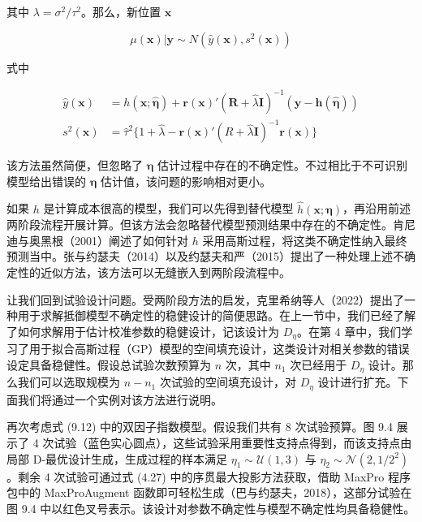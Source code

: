 \documentclass{ctexart}
\begin{document}
其中 $\lambda=\sigma^2/\tau^2$。那么，新位置 $\boldsymbol{x}$ 

\begin{equation*}
\mu(\boldsymbol{x})|\boldsymbol{y}\sim\mathcal{}{N}(\widehat{y}(\boldsymbol{x}),s^2(\boldsymbol{x}))
\end{equation*}

式中

\begin{align*}
\widehat{y}(\boldsymbol{x})&=h(\boldsymbol{x};\widehat{\boldsymbol{\eta}})+\boldsymbol{r}(\boldsymbol{x})'(\boldsymbol{R}+\widehat{\lambda}\boldsymbol{I})^{-1}(\boldsymbol{y}-\boldsymbol{h}(\widehat{\boldsymbol{\eta}}))\\
s^2(\boldsymbol{x})&=\widehat{\tau}^2\{1+\widehat{\lambda}-\boldsymbol{r}(\boldsymbol{x})'(R+\widehat{\lambda}\boldsymbol{I})^{-1}\boldsymbol{r}(\boldsymbol{x})\}
\end{align*}

该方法虽然简便，但忽略了 $\boldsymbol{\eta}$ 估计过程中存在的不确定性。不过相比于不可识别模型给出错误的 $\boldsymbol{\eta}$ 估计值，该问题的影响相对更小。

如果 $h$ 是计算成本很高的模型，我们可以先得到替代模型 $\widehat{h}(\boldsymbol{x};\boldsymbol{\eta})$，再沿用前述两阶段流程开展计算。但该方法会忽略替代模型预测结果中存在的不确定性。肯尼迪与奥黑根（2001）阐述了如何针对 $h$ 采用高斯过程，将这类不确定性纳入最终预测当中。张与约瑟夫（2014）以及约瑟夫和严（2015）提出了一种处理上述不确定性的近似方法，该方法可以无缝嵌入到两阶段流程中。

让我们回到试验设计问题。受两阶段方法的启发，克里希纳等人（2022）提出了一种用于求解抵御模型不确定性的稳健设计的简便思路。在上一节中，我们已经了解了如何求解用于估计校准参数的稳健设计，记该设计为 $D_\eta$。在第 4 章中，我们学习了用于拟合高斯过程（GP）模型的空间填充设计，这类设计对相关参数的错误设定具备稳健性。假设总试验次数预算为 $n$ 次，其中 $n_1$ 次已经用于 $D_\eta$ 设计。那么我们可以选取规模为 $n-n_1$ 次试验的空间填充设计，对 $D_\eta$ 设计进行扩充。下面我们将通过一个实例对该方法进行说明。

再次考虑式 (9.12) 中的双因子指数模型。假设我们共有 8 次试验预算。图 9.4 展示了 4 次试验（蓝色实心圆点），这些试验采用重要性支持点得到，而该支持点由局部 D‑最优设计生成，生成过程的样本满足 $\eta_1\sim\mathcal{U}(1,3)$ 与 $\eta_2\sim\mathcal{N}(2,1/2^2)$。剩余 4 次试验可通过式 (4.27) 中的序贯最大投影方法获取，借助 MaxPro 程序包中的 MaxProAugment 函数即可轻松生成（巴与约瑟夫，2018），这部分试验在图 9.4 中以红色叉号表示。该设计对参数不确定性与模型不确定性均具备稳健性。
\end{document}
